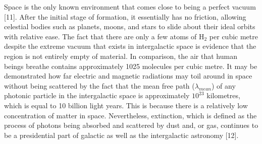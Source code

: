 \documentclass[conference]{IEEEtran}
\begin{document}
Space is the only known environment that comes close to being a perfect vacuum [11]. After the initial stage of formation, it essentially has no friction, allowing celestial bodies such as planets, moons, and stars to slide about their ideal orbits with relative ease. The fact that there are only a few atoms of H$_2$ per cubic metre despite the extreme vacuum that exists in intergalactic space is evidence that the region is not entirely empty of material. In comparison, the air that human beings breathe contains approximately 1025 molecules per cubic metre. It may be demonstrated how far electric and magnetic radiations may toil around in space without being scattered by the fact that the mean free path ($\lambda_{mean}$) of any photonic particle in the intergalactic space is approximately $10^{23}$ kilometres, which is equal to 10 billion light years. This is because there is a relatively low concentration of matter in space. Nevertheless, extinction, which is defined as the process of photons being absorbed and scattered by dust and, or gas, continues to be a presidential part of galactic as well as the intergalactic astronomy [12]. \\
\end{document}
